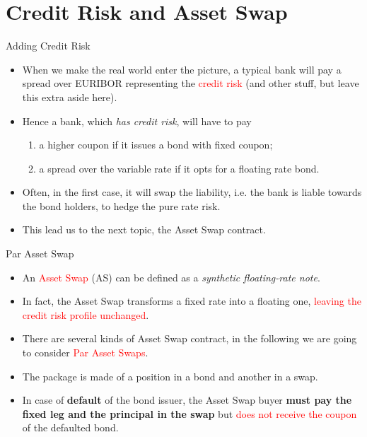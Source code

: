 \documentclass{beamer}
\begin{document}
\section{Credit Risk and Asset Swap}
\begin{frame}{Adding Credit Risk}
	\begin{itemize}
		\item When we make the real world enter the picture, a typical bank will pay a spread over EURIBOR representing the \textcolor{red}{credit risk} (and other stuff, but leave this extra aside here). 
		\item<2-> Hence a bank, which \emph{has credit risk},  will have to pay
		\begin{enumerate}
			\item a higher coupon if it issues a bond with fixed coupon;
			\item a spread over the variable rate if it opts for a floating rate bond.
		\end{enumerate}
		\item<3-> Often, in the first case, it will swap the liability, i.e. the bank is liable towards the bond holders, to hedge the pure rate risk. 
		\item<4-> This lead us to the next topic, the Asset Swap contract.
	\end{itemize}
\end{frame}

\begin{frame}{Par Asset Swap}
	\begin{itemize}
		\item<1-> An \textcolor{red}{Asset Swap} (AS) can be defined as a \emph{synthetic floating-rate note}.
		\item In fact, the Asset Swap transforms a fixed rate into a floating one, \textcolor{red}{leaving the credit risk profile unchanged}.
		\item<1-> There are several kinds of Asset Swap contract, in the following we are going to consider \textcolor{red}{Par Asset Swaps}. 
		\item<2-> The package is made of a position in a bond and another in a swap.
		\item<3-> In case of \textbf{default} of the bond issuer, the Asset Swap buyer \textbf{must pay the fixed leg and the principal in the swap} but \textcolor{red}{does not receive the coupon} of the defaulted bond. 
	\end{itemize}
\end{frame}
\end{document}
